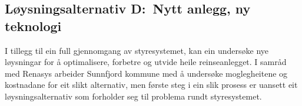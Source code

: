 \newpage
\subsection{Løysningsalternativ D:~Nytt anlegg, ny teknologi}
I tillegg til ein full gjennomgang av styresystemet, 
kan ein undersøke nye løysningar for å optimalisere, forbetre og utvide heile reinseanlegget.
I samråd med Renasys arbeider Sunnfjord kommune med å undersøke moglegheitene og kostnadane for eit slikt alternativ,
men første steg i ein slik prosess er uansett eit løysningsalternativ som forholder seg til problema rundt styresystemet.


